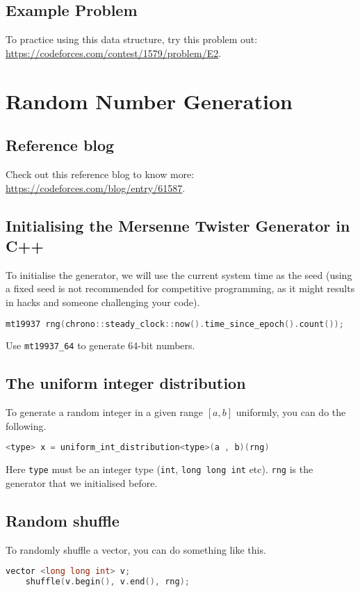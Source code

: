 \documentclass[12pt,a4paper]{amsart}
\numberwithin{equation}{section}
\theoremstyle{definition}
\begin{document}
\subsection{Example Problem} To practice using this data structure, try this problem out: \url{https://codeforces.com/contest/1579/problem/E2}.

\section{Random Number Generation}
\subsection{Reference blog} Check out this reference blog to know more: \url{https://codeforces.com/blog/entry/61587}. 

\subsection{Initialising the Mersenne Twister Generator in C++} To initialise the generator, we will use the current system time as the seed (using a fixed seed is not recommended for competitive programming, as it might results in hacks and someone challenging your code). 
\begin{lstlisting}[language=C++]
    mt19937 rng(chrono::steady_clock::now().time_since_epoch().count());
\end{lstlisting}
Use \verb|mt19937_64| to generate 64-bit numbers. 

\subsection{The uniform integer distribution} To generate a random integer in a given range $[a , b]$ uniformly, you can do the following. 
\begin{lstlisting}[language=C++]
    <type> x = uniform_int_distribution<type>(a , b)(rng)
\end{lstlisting}
Here \verb|type| must be an integer type (\verb|int|, \verb|long long int| etc). \verb|rng| is the generator that we initialised before. 

\subsection{Random shuffle} To randomly shuffle a vector, you can do something like this. 
\begin{lstlisting}[language=C++]
    vector <long long int> v;
    shuffle(v.begin(), v.end(), rng);
\end{lstlisting}
\end{document}
